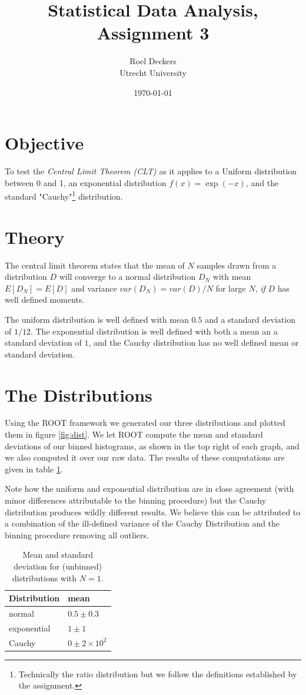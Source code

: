 \documentclass[notitlepage, 12pt, a4paper, twoside, titlepage]{article}
\title{Statistical Data Analysis, Assignment 3}
\author{Roel Deckers  \\
	Utrecht University
	}
\date{\today}
\begin{document}
\maketitle

\section{Objective}
To test the {\em Central Limit Theorem (CLT)} as it applies to a Uniform distribution between 0 and 1, an exponential distribution $f(x) = \exp(-x)$, and the standard "Cauchy"\footnote{Technically the ratio distribution but we follow the definitions established by the assignment.} distribution.

\section{Theory}
The central limit theorem states that the mean of $N$ samples drawn from a distribution $D$ will converge to a normal distribution $D_N$ with mean $E\left[D_N\right] = E\left[D\right]$ and variance $var(D_N) = var(D)/N$ for large $N$, {\em if} $D$ has well defined moments.
\par The uniform distribution is well defined with mean $0.5$ and a standard deviation of $1/12$. The exponential distribution is well defined with both a mean an a standard deviation of $1$, and the Cauchy distribution has no
well defined mean or standard deviation.

\section{The Distributions}
Using the ROOT framework we generated our three distributions and plotted them in figure \ref{fig:dist}. We let ROOT compute the mean and standard deviations of our binned histograms, as shown in the top right of each graph, and we also computed it
over our raw data. The results of these computations are given in table \ref{tbl:mean}. \par Note how the uniform and exponential distribution are in close agreement (with minor differences attributable to the binning procedure) but the Cauchy distribution produces wildly different results.
We believe this can be attributed to a combination of the ill-defined variance of the Cauchy Distribution and the binning procedure removing all outliers.

\begin{table}[h!]
\centering
\begin{tabular}{|l||l|}
\hline
{\bf Distribution} & \bf{mean}\\
\hline
normal & $0.5 \pm 0.3$ \\ \hline
exponential & $1 \pm 1$ \\ \hline
Cauchy & $0 \pm 2\times 10 ^2$ \\ \hline
\end{tabular}
\caption{Mean and standard deviation for (unbinned) distributions with $N=1$.}
\label{tbl:mean}
\end{table}
\end{document}
